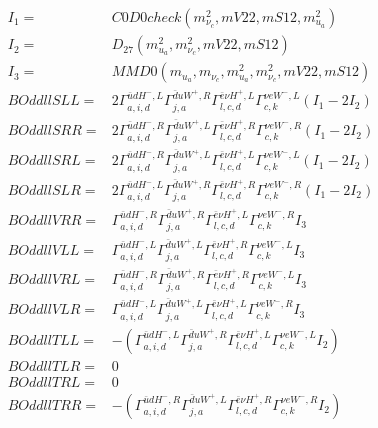 \documentclass[A4,landscape]{article}
\begin{document}
\begin{align} 
I_1 = & C0D0check(m^2_{\nu_{{c}}}, mV22, mS12, m^2_{u_{{a}}}) \\ 
I_2 = & D_{27}(m^2_{u_{{a}}}, m^2_{\nu_{{c}}}, mV22, mS12) \\ 
I_3 = & MMD0(m_{u_{{a}}}, m_{\nu_{{c}}}, m^2_{u_{{a}}}, m^2_{\nu_{{c}}}, mV22, mS12) \\ 
  BOddllSLL= & 2  \Gamma^{\bar{u}d H^- ,L}_{a, i, d} \Gamma^{\bar{d}u W^+ ,R}_{j, a} \Gamma^{\bar{e}\nu H^+,L}_{l, c, d} \Gamma^{\nu e W^-,L}_{c, k} (I_1 - 2 I_2) \\ 
  BOddllSRR= & 2  \Gamma^{\bar{u}d H^- ,R}_{a, i, d} \Gamma^{\bar{d}u W^+ ,L}_{j, a} \Gamma^{\bar{e}\nu H^+,R}_{l, c, d} \Gamma^{\nu e W^-,R}_{c, k} (I_1 - 2 I_2) \\ 
  BOddllSRL= & 2  \Gamma^{\bar{u}d H^- ,R}_{a, i, d} \Gamma^{\bar{d}u W^+ ,L}_{j, a} \Gamma^{\bar{e}\nu H^+,L}_{l, c, d} \Gamma^{\nu e W^-,L}_{c, k} (I_1 - 2 I_2) \\ 
  BOddllSLR= & 2  \Gamma^{\bar{u}d H^- ,L}_{a, i, d} \Gamma^{\bar{d}u W^+ ,R}_{j, a} \Gamma^{\bar{e}\nu H^+,R}_{l, c, d} \Gamma^{\nu e W^-,R}_{c, k} (I_1 - 2 I_2) \\ 
  BOddllVRR= &  \Gamma^{\bar{u}d H^- ,R}_{a, i, d} \Gamma^{\bar{d}u W^+ ,R}_{j, a} \Gamma^{\bar{e}\nu H^+,L}_{l, c, d} \Gamma^{\nu e W^-,R}_{c, k} I_3 \\ 
  BOddllVLL= &  \Gamma^{\bar{u}d H^- ,L}_{a, i, d} \Gamma^{\bar{d}u W^+ ,L}_{j, a} \Gamma^{\bar{e}\nu H^+,R}_{l, c, d} \Gamma^{\nu e W^-,L}_{c, k} I_3 \\ 
  BOddllVRL= &  \Gamma^{\bar{u}d H^- ,R}_{a, i, d} \Gamma^{\bar{d}u W^+ ,R}_{j, a} \Gamma^{\bar{e}\nu H^+,R}_{l, c, d} \Gamma^{\nu e W^-,L}_{c, k} I_3 \\ 
  BOddllVLR= &  \Gamma^{\bar{u}d H^- ,L}_{a, i, d} \Gamma^{\bar{d}u W^+ ,L}_{j, a} \Gamma^{\bar{e}\nu H^+,L}_{l, c, d} \Gamma^{\nu e W^-,R}_{c, k} I_3 \\ 
  BOddllTLL= & -( \Gamma^{\bar{u}d H^- ,L}_{a, i, d} \Gamma^{\bar{d}u W^+ ,R}_{j, a} \Gamma^{\bar{e}\nu H^+,L}_{l, c, d} \Gamma^{\nu e W^-,L}_{c, k} I_2) \\ 
  BOddllTLR= & 0 \\ 
  BOddllTRL= & 0 \\ 
  BOddllTRR= & -( \Gamma^{\bar{u}d H^- ,R}_{a, i, d} \Gamma^{\bar{d}u W^+ ,L}_{j, a} \Gamma^{\bar{e}\nu H^+,R}_{l, c, d} \Gamma^{\nu e W^-,R}_{c, k} I_2) \\ 
\end{align} 
\end{document}
